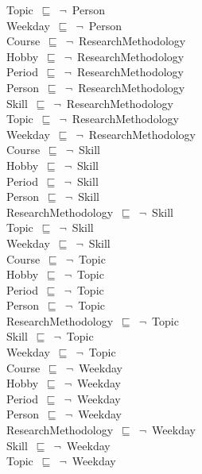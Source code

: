 \documentclass{article}
\begin{document}
Topic~\ensuremath{\sqsubseteq}~\ensuremath{\lnot}~Person\\
Weekday~\ensuremath{\sqsubseteq}~\ensuremath{\lnot}~Person\\
Course~\ensuremath{\sqsubseteq}~\ensuremath{\lnot}~ResearchMethodology\\
Hobby~\ensuremath{\sqsubseteq}~\ensuremath{\lnot}~ResearchMethodology\\
Period~\ensuremath{\sqsubseteq}~\ensuremath{\lnot}~ResearchMethodology\\
Person~\ensuremath{\sqsubseteq}~\ensuremath{\lnot}~ResearchMethodology\\
Skill~\ensuremath{\sqsubseteq}~\ensuremath{\lnot}~ResearchMethodology\\
Topic~\ensuremath{\sqsubseteq}~\ensuremath{\lnot}~ResearchMethodology\\
Weekday~\ensuremath{\sqsubseteq}~\ensuremath{\lnot}~ResearchMethodology\\
Course~\ensuremath{\sqsubseteq}~\ensuremath{\lnot}~Skill\\
Hobby~\ensuremath{\sqsubseteq}~\ensuremath{\lnot}~Skill\\
Period~\ensuremath{\sqsubseteq}~\ensuremath{\lnot}~Skill\\
Person~\ensuremath{\sqsubseteq}~\ensuremath{\lnot}~Skill\\
ResearchMethodology~\ensuremath{\sqsubseteq}~\ensuremath{\lnot}~Skill\\
Topic~\ensuremath{\sqsubseteq}~\ensuremath{\lnot}~Skill\\
Weekday~\ensuremath{\sqsubseteq}~\ensuremath{\lnot}~Skill\\
Course~\ensuremath{\sqsubseteq}~\ensuremath{\lnot}~Topic\\
Hobby~\ensuremath{\sqsubseteq}~\ensuremath{\lnot}~Topic\\
Period~\ensuremath{\sqsubseteq}~\ensuremath{\lnot}~Topic\\
Person~\ensuremath{\sqsubseteq}~\ensuremath{\lnot}~Topic\\
ResearchMethodology~\ensuremath{\sqsubseteq}~\ensuremath{\lnot}~Topic\\
Skill~\ensuremath{\sqsubseteq}~\ensuremath{\lnot}~Topic\\
Weekday~\ensuremath{\sqsubseteq}~\ensuremath{\lnot}~Topic\\
Course~\ensuremath{\sqsubseteq}~\ensuremath{\lnot}~Weekday\\
Hobby~\ensuremath{\sqsubseteq}~\ensuremath{\lnot}~Weekday\\
Period~\ensuremath{\sqsubseteq}~\ensuremath{\lnot}~Weekday\\
Person~\ensuremath{\sqsubseteq}~\ensuremath{\lnot}~Weekday\\
ResearchMethodology~\ensuremath{\sqsubseteq}~\ensuremath{\lnot}~Weekday\\
Skill~\ensuremath{\sqsubseteq}~\ensuremath{\lnot}~Weekday\\
Topic~\ensuremath{\sqsubseteq}~\ensuremath{\lnot}~Weekday\\
\end{document}
